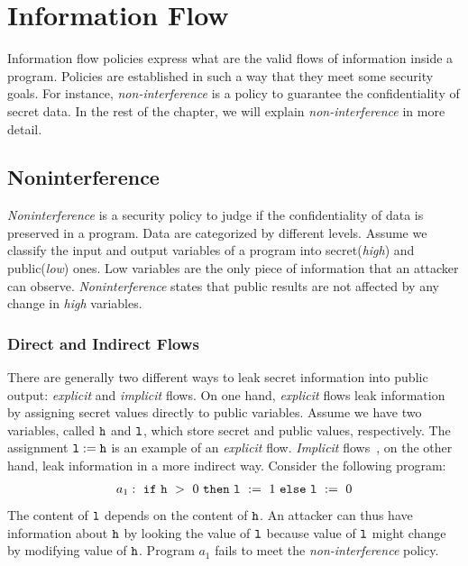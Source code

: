 \documentclass{report}
\begin{document}

\chapter{Information Flow}

Information flow policies express what are the valid flows of information
inside a program. Policies are established in such a way that they meet
some security goals. For instance, {\it non-interference} is a policy to
guarantee the confidentiality of secret data. In the rest of the chapter, we will explain
{\it non-interference} in more detail.

\section{Noninterference}
\label{chap2:noninterference}
{\it Noninterference} is a security policy to judge if the confidentiality of data
is preserved in a program. Data are categorized by different levels.
Assume we classify the input and output variables of a program 
into secret({\it high}) and public({\it low}) ones. 
Low variables are the only piece of information that an attacker can observe.
{\it Noninterference} states that public results are not affected by any
change in {\it high} variables. 

\subsection{Direct and Indirect Flows}
There are generally two different ways to leak secret information into
public output: {\it explicit} and {\it implicit} flows. 
On one hand,
{\it explicit} flows leak information by assigning secret values
directly to public variables.
Assume we have two variables, called $\mathtt{h}$ and $\mathtt{l}$,
which store secret and public values, respectively. 
The assignment $\mathtt{l} := \mathtt{h}$ is an example of an {\it explicit} flow.
{\it Implicit} flows~\cite{Denning:Denning:Certification}, on the other hand,
leak information in a more indirect way.
Consider the following program:
\begin{align*}
a_1:~\mathtt{if}~\mathtt{h}~>~0~\mathtt{then}~\mathtt{l}~:=~1~\mathtt{else}~\mathtt{l}~:=~0
\end{align*}
The content of $\mathtt{l}$ depends on the content of $\mathtt{h}$.
An attacker can thus have information about $\mathtt{h}$ by looking
the value of $\mathtt{l}$ because value of $\mathtt{l}$ might change by
modifying value of $\mathtt{h}$. 
Program $a_1$ fails to meet the {\it non-interference} policy.
\end{document}
